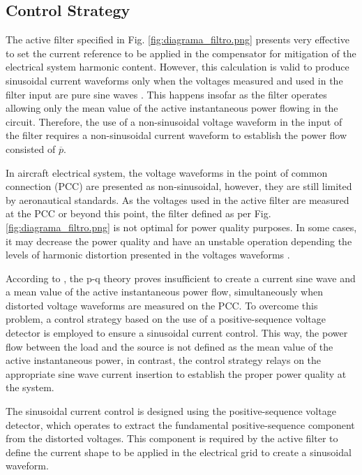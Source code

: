 
\subsection{Control Strategy}

The active filter specified in Fig. \ref{fig:diagrama_filtro.png} presents very effective to set the current reference to be applied in the compensator for mitigation of the electrical system harmonic content. However, this calculation is valid to produce sinusoidal current waveforms only when the voltages measured and used in the filter input are pure sine waves \citep{Akagi2007}. This happens insofar as the filter operates allowing only the mean value of the active instantaneous power flowing in the circuit. Therefore, the use of a non-sinusoidal voltage waveform in the input of the filter requires a non-sinusoidal current waveform to establish the power flow consisted of $\overline{p}$.

In aircraft electrical system, the voltage waveforms in the point of common connection (PCC) are presented as non-sinusoidal, however, they are still limited by aeronautical standards. As the voltages used in the active filter are measured at the PCC or beyond this point, the filter defined as per Fig. \ref{fig:diagrama_filtro.png} is not optimal for power quality purposes. In some cases, it may decrease the power quality and have an unstable operation depending the levels of harmonic distortion presented in the voltages waveforms \citep{Akagi2007}.

According to \citep{Akagi2007}, the p-q theory proves insufficient to create a current sine wave and a mean value of the active instantaneous power flow, simultaneously when distorted voltage waveforms are measured on the PCC. To overcome this problem, a control strategy based on the use of a positive-sequence voltage detector is employed to ensure a sinusoidal current control. This way, the power flow between the load and the source is not defined as the mean value of the active instantaneous power, in contrast, the control strategy relays on the appropriate sine wave current insertion to establish the proper power quality at the system.

The sinusoidal current control is designed using the positive-sequence voltage detector, which operates to extract the fundamental positive-sequence component from the distorted voltages. This component is required by the active filter to define the current shape to be applied in the electrical grid to create a sinusoidal waveform. 

